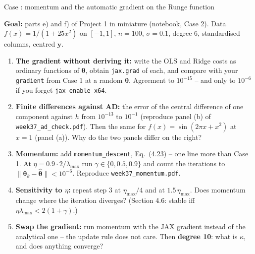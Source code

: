 \documentclass[10pt,aspectratio=169]{beamer}
\newcounter{case}
\newenvironment{case}[1][]{%
  \stepcounter{case}%
  \begin{frame}[fragile,environment=case]{Case \arabic{case}: #1}%
}{\end{frame}}
\begin{document}
\begin{case}[momentum and the automatic gradient on the Runge function]
\textbf{Goal:} parts e) and f) of Project 1 in miniature (notebook, Case 2).
Data $f(x)=1/(1+25x^2)$ on $[-1,1]$, $n=100$, $\sigma=0.1$, degree 6,
standardised columns, centred $\bm{y}$.
\begin{enumerate}
  \item \textbf{The gradient without deriving it:} write the OLS and Ridge
        costs as ordinary functions of $\bm{\theta}$, obtain
        \texttt{jax.grad} of each, and compare with your \texttt{gradient}
        from Case 1 at a random $\bm{\theta}$.  Agreement to $10^{-15}$ --
        and only to $10^{-6}$ if you forget \texttt{jax\_enable\_x64}.
  \item \textbf{Finite differences against AD:} the error of the central
        difference of one component against $h$ from $10^{-13}$ to $10^{-1}$
        (reproduce panel (b) of \texttt{week37\_ad\_check.pdf}).  Then the
        same for $f(x)=\sin(2\pi x+x^2)$ at $x=1$ (panel (a)).  Why do the
        two panels differ on the right?
  \item \textbf{Momentum:} add \texttt{momentum\_descent}, Eq.~(4.23) -- one
        line more than Case 1.  At $\eta=0.9\cdot2/\lambda_{\max}$ run
        $\gamma\in\{0,0.5,0.9\}$ and count the iterations to
        $\|\bm{\theta}_k-\hat{\bm{\theta}}\|<10^{-6}$.  Reproduce
        \texttt{week37\_momentum.pdf}.
  \item \textbf{Sensitivity to $\eta$:} repeat step 3 at $\eta_{\max}/4$ and
        at $1.5\,\eta_{\max}$.  Does momentum change where the iteration
        diverges?  (Section 4.6: stable iff $\eta\lambda_{\max}<2(1+\gamma)$.)
  \item \textbf{Swap the gradient:} run momentum with the JAX gradient
        instead of the analytical one -- the update rule does not care.
        Then \textbf{degree 10}: what is $\kappa$, and does anything converge?
\end{enumerate}
\end{case}
\end{document}
